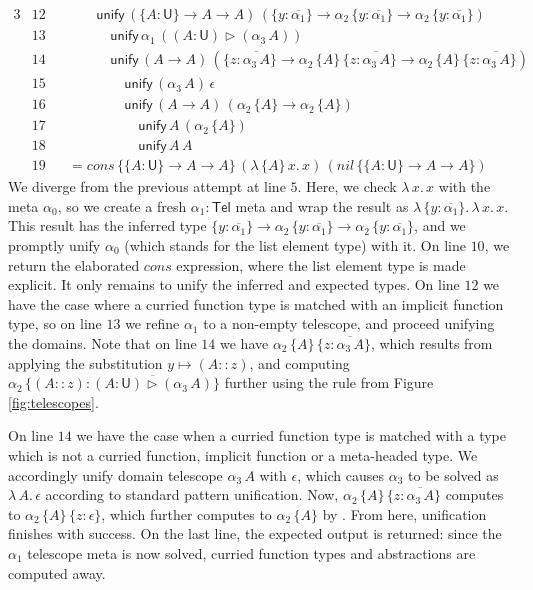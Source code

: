 \documentclass[acmsmall,review,anonymous,prologue,dvipsnames]{acmart}\settopmatter{printfolios=true,printccs=false,printacmref=false}
\renewcommand{\U}{\mathsf{U}}
\newcommand{\unify}{\mathsf{unify}}
\newcommand{\Tel}{\mathsf{Tel}}
\newcommand{\TCons}{\triangleright}
\newcommand{\ol}[1]{\overline{#1}}
\theoremstyle{remark}
\begin{document}
\begin{example}
\begin{alignat*}{3}
  & \scriptstyle{12} && \qquad \unify\,(\{A : \U\}\to A \to A)\,(\{y : \ol{\alpha_1}\} \to \alpha_2\,\{y : \ol{\alpha_1}\}\to \alpha_2\,\{y : \ol{\alpha_1}\})\\
  & \scriptstyle{13} && \qquad\quad \unify\,\alpha_1\,((A : \U) \TCons (\alpha_3\,A))\\
  & \scriptstyle{14} && \qquad \quad \unify\,(A \to A)\,(\{z : \ol{\alpha_3\,A}\} \to \alpha_2\,\{A\}\,\{z : \ol{\alpha_3\,A}\}\to \alpha_2\,\{A\}\,\{z : \ol{\alpha_3\,A}\})\\
  & \scriptstyle{15} && \qquad \qquad \unify\,(\alpha_3\,A)\,\epsilon\\
  & \scriptstyle{16} && \qquad \qquad \unify\,(A \to A)\,(\alpha_2\,\{A\} \to \alpha_2\,\{A\})\\
  & \scriptstyle{17} && \qquad \qquad \quad \unify\,A\,(\alpha_2\,\{A\})\\
  & \scriptstyle{18} && \qquad \qquad \quad \unify\,A\, A\\
  & \scriptstyle{19} && = cons\,\{\{A : \U\}\to A \to A\}\,(\lambda\,\{A\}\,x.\,x)\,(nil\,\{\{A : \U\}\to A \to A\})
\end{alignat*}
We diverge from the previous attempt at line $\scriptstyle{5}$. Here, we check
$\lambda\,x.\,x$ with the meta $\alpha_0$, so we create a fresh $\alpha_1 :
\Tel$ meta and wrap the result as $\lambda\,\{y :
\ol{\alpha_1}\}.\,\lambda\,x.\,x$. This result has the inferred type $\{y :
\ol{\alpha_1}\} \to \alpha_2\,\{y : \ol{\alpha_1}\}\to \alpha_2\,\{y :
\ol{\alpha_1}\}$, and we promptly unify $\alpha_0$ (which stands for the list
element type) with it. On line $\scriptstyle{10}$, we return the elaborated
$cons$ expression, where the list element type is made explicit. It only remains
to unify the inferred and expected types. On line $\scriptstyle{12}$ we have the
case where a curried function type is matched with an implicit function type, so
on line $\scriptstyle{13}$ we refine $\alpha_1$ to a non-empty telescope, and
proceed unifying the domains. Note that on line $\scriptstyle{14}$ we have
$\alpha_2\,\{A\}\,\{z : \ol{\alpha_3\,A}\}$, which results from applying the
substitution $y \mapsto (A :: z)$, and computing $\alpha_2\,\{(A :: z) : \ol{(A :
  \U) \TCons (\alpha_3\,A)}\}$ further using the \LabTirName{app-$\TCons$} rule
from Figure \ref{fig:telescopes}.

On line $\scriptstyle{14}$ we have the case when a curried function type is
matched with a type which is not a curried function, implicit function or a
meta-headed type. We accordingly unify domain telescope $\alpha_3\,A$ with
$\epsilon$, which causes $\alpha_3$ to be solved as $\lambda\,A.\,\epsilon$
according to standard pattern unification. Now, $\alpha_2\,\{A\}\,\{z :
\ol{\alpha_3\,A}\}$ computes to $\alpha_2\,\{A\}\,\{z : \epsilon\}$, which
further computes to $\alpha_2\,\{A\}$ by . From here,
unification finishes with success. On the last line, the expected output is
returned: since the $\alpha_1$ telescope meta is now solved, curried function
types and abstractions are computed away.
\end{example}
\end{document}
